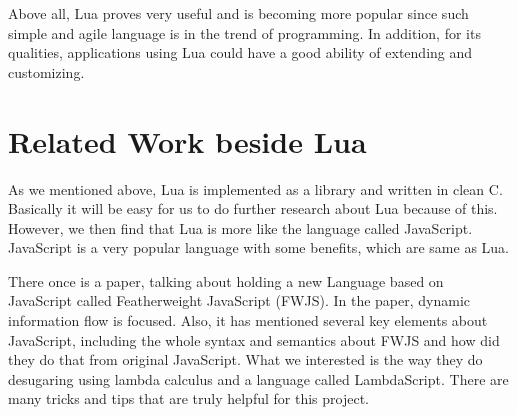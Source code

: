 Above all, Lua proves very useful and is becoming more popular since such simple and agile language is in the trend of programming. In addition, for its qualities, applications using Lua could have a good ability of extending and customizing.

\section{Related Work beside Lua}
As we mentioned above, Lua is implemented as a library and written in clean C. Basically it will be easy for us to do further research about Lua because of this. However, we then find that Lua is more like the language called JavaScript. JavaScript is a very popular language with some benefits, which are same as Lua.

There once is a paper, talking about holding a new Language based on JavaScript called Featherweight JavaScript (FWJS)\cite{FWJS}. In the paper, dynamic information flow is focused. Also, it has mentioned several key elements about JavaScript, including the whole syntax and semantics about FWJS and how did they do that from original JavaScript. What we interested is the way they do desugaring using lambda calculus and a language called LambdaScript. There are many tricks and tips that are truly helpful for this project.
